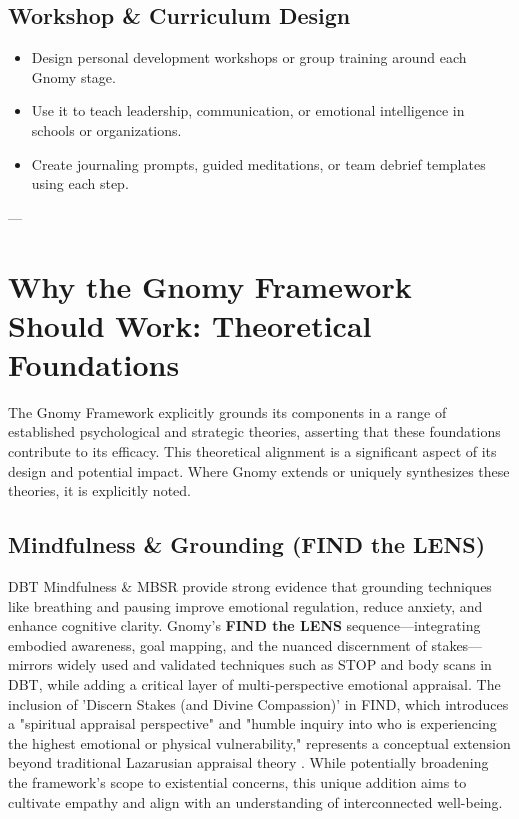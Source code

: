 \documentclass{article}
\begin{document}
\subsection{Workshop \& Curriculum Design}
\begin{itemize}[noitemsep,topsep=0pt]
    \item Design personal development workshops or group training around each Gnomy stage.
    \item Use it to teach leadership, communication, or emotional intelligence in schools or organizations.
    \item Create journaling prompts, guided meditations, or team debrief templates using each step.
\end{itemize}

---

\section{Why the Gnomy Framework Should Work: Theoretical Foundations}
The Gnomy Framework explicitly grounds its components in a range of established psychological and strategic theories, asserting that these foundations contribute to its efficacy. This theoretical alignment is a significant aspect of its design and potential impact. Where Gnomy extends or uniquely synthesizes these theories, it is explicitly noted.

\subsection{Mindfulness \& Grounding (FIND the LENS)}
DBT Mindfulness \cite{linehan1993cognitive} \& MBSR \cite{kabat1990full} provide strong evidence that grounding techniques like breathing and pausing improve emotional regulation, reduce anxiety, and enhance cognitive clarity. Gnomy's \textbf{FIND the LENS} sequence—integrating embodied awareness, goal mapping, and the nuanced discernment of stakes—mirrors widely used and validated techniques such as STOP and body scans in DBT, while adding a critical layer of multi-perspective emotional appraisal. The inclusion of 'Discern Stakes (and Divine Compassion)' in FIND, which introduces a "spiritual appraisal perspective" and "humble inquiry into who is experiencing the highest emotional or physical vulnerability," represents a conceptual extension beyond traditional Lazarusian appraisal theory \cite{lazarus1984stress}. While potentially broadening the framework's scope to existential concerns, this unique addition aims to cultivate empathy and align with an understanding of interconnected well-being.
\end{document}
